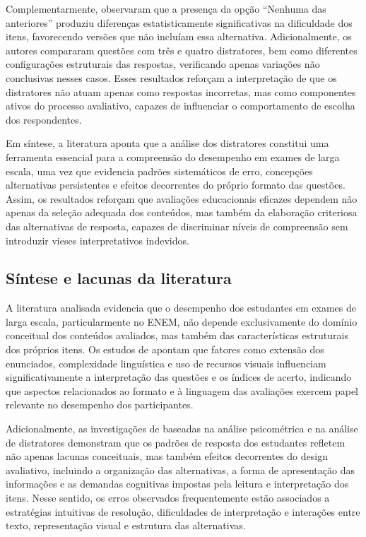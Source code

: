 \documentclass[a4paper,10pt, twocolumn]{article}
\begin{document}
Complementarmente, \textcite{Caldwell2013} observaram que a presença da opção “Nenhuma das anteriores” produziu diferenças estatisticamente significativas na dificuldade dos itens, favorecendo versões que não incluíam essa alternativa. Adicionalmente, os autores compararam questões com três e quatro distratores, bem como diferentes configurações estruturais das respostas, verificando apenas variações não conclusivas nesses casos. Esses resultados reforçam a interpretação de que os distratores não atuam apenas como respostas incorretas, mas como componentes ativos do processo avaliativo, capazes de influenciar o comportamento de escolha dos respondentes.

Em síntese, a literatura aponta que a análise dos distratores constitui uma ferramenta essencial para a compreensão do desempenho em exames de larga escala, uma vez que evidencia padrões sistemáticos de erro, concepções alternativas persistentes e efeitos decorrentes do próprio formato das questões. Assim, os resultados reforçam que avaliações educacionais eficazes dependem não apenas da seleção adequada dos conteúdos, mas também da elaboração criteriosa das alternativas de resposta, capazes de discriminar níveis de compreensão sem introduzir vieses interpretativos indevidos.


\subsection{Síntese e lacunas da literatura}

A literatura analisada evidencia que o desempenho dos estudantes em exames de larga escala, particularmente no ENEM, não depende exclusivamente do domínio conceitual dos conteúdos avaliados, mas também das características estruturais dos próprios itens. Os estudos de \textcite{Pullishery2020,silva2019desempenho,goncalves2014questoes,Cestaro2020} apontam que fatores como extensão dos enunciados, complexidade linguística e uso de recursos visuais influenciam significativamente a interpretação das questões e os índices de acerto, indicando que aspectos relacionados ao formato e à linguagem das avaliações exercem papel relevante no desempenho dos participantes.

Adicionalmente, as investigações de \cite{Caldwell2013,correia2004complexidade} baseadas na análise psicométrica e na análise de distratores demonstram que os padrões de resposta dos estudantes refletem não apenas lacunas conceituais, mas também efeitos decorrentes do design avaliativo, incluindo a organização das alternativas, a forma de apresentação das informações e as demandas cognitivas impostas pela leitura e interpretação dos itens. Nesse sentido, os erros observados frequentemente estão associados a estratégias intuitivas de resolução, dificuldades de interpretação e interações entre texto, representação visual e estrutura das alternativas.
\end{document}
